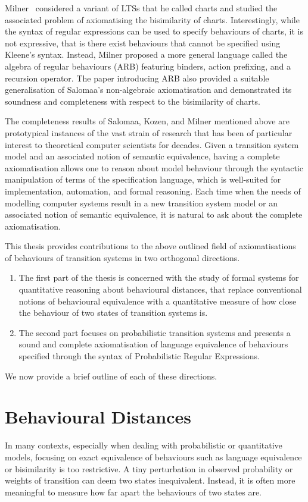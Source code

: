 Milner~\cite{Milner:1984:Complete} considered a variant of LTSs that he called charts and studied the associated problem of axiomatising the bisimilarity of charts. Interestingly, while the syntax of regular expressions can be used to specify behaviours of charts, it is not expressive, that is there exist behaviours that cannot be specified using Kleene's syntax. Instead, Milner proposed a more general language called the algebra of regular behaviours (ARB) featuring binders, action prefixing, and a recursion operator. The paper introducing ARB also provided a suitable generalisation of Salomaa's non-algebraic axiomatisation and demonstrated its soundness and completeness with respect to the bisimilarity of charts.   

The completeness results of Salomaa, Kozen, and Milner mentioned above are prototypical instances of the vast strain of research that has been of particular interest to theoretical computer scientists for decades. Given a transition system model and an associated notion of semantic equivalence, having a complete axiomatisation allows one to reason about model behaviour through the syntactic manipulation of terms of the specification language, which is well-suited for implementation, automation, and formal reasoning. Each time when the needs of modelling computer systems result in a new transition system model or an associated notion of semantic equivalence, it is natural to ask about the complete axiomatisation. 

This thesis provides contributions to the above outlined field of axiomatisations of behaviours of transition systems in two orthogonal directions.
\begin{enumerate}
	\item The first part of the thesis is concerned with the study of formal systems for quantitative reasoning about behavioural distances, that replace conventional notions of behavioural equivalence with a quantitative measure of how close the behaviour of two states of transition systems is.
	\item The second part focuses on probabilistic transition systems and presents a sound and complete axiomatisation of language equivalence of behaviours specified through the syntax of Probabilistic Regular Expressions.
	\end{enumerate}	
We now provide a brief outline of each of these directions.
\section{Behavioural Distances}
In many contexts, especially when dealing with probabilistic or quantitative models, focusing on exact equivalence of behaviours such as language equivalence or bisimilarity is too restrictive. A tiny perturbation in observed probability or weights of transition can deem two states inequivalent.  Instead, it is often more meaningful to measure how far apart the behaviours of two states are. 

